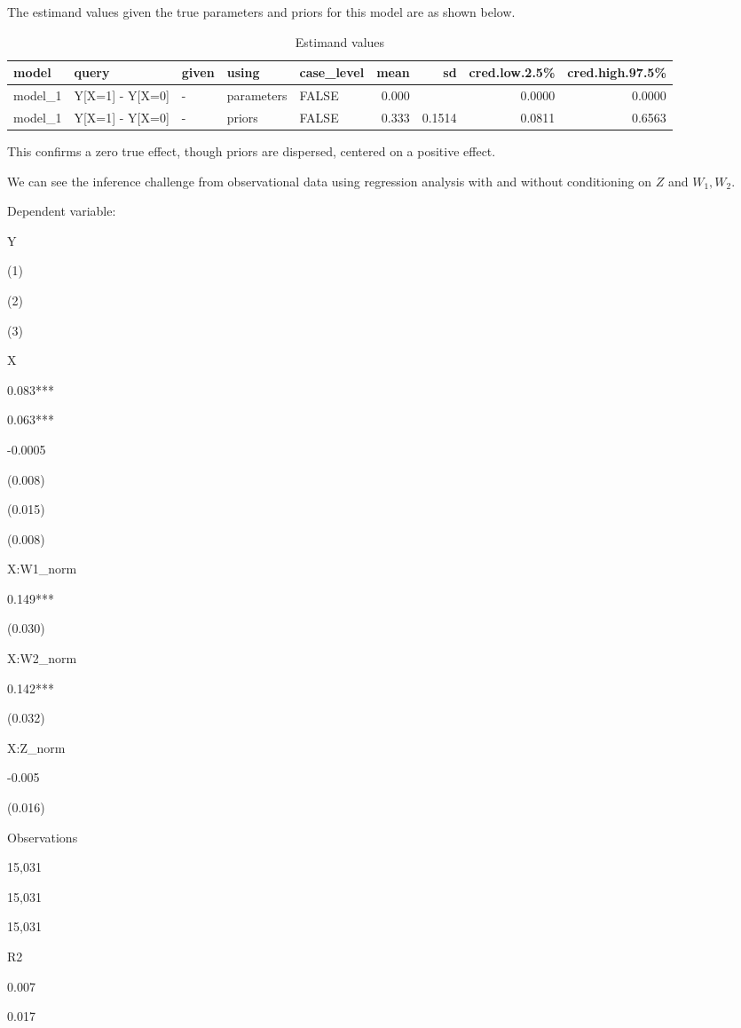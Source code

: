 \documentclass[
  12pt,
]{book}
\begin{document}
The estimand values given the true parameters and priors for this model are as shown below.

\begin{table}

\caption{\label{tab:appsimpleselcconf5}Estimand values}
\centering
\begin{tabular}[t]{l|l|l|l|l|r|r|r|r}
\hline
model & query & given & using & case\_level & mean & sd & cred.low.2.5\% & cred.high.97.5\%\\
\hline
model\_1 & Y[X=1] - Y[X=0] & - & parameters & FALSE & 0.000 &  & 0.0000 & 0.0000\\
\hline
model\_1 & Y[X=1] - Y[X=0] & - & priors & FALSE & 0.333 & 0.1514 & 0.0811 & 0.6563\\
\hline
\end{tabular}
\end{table}

This confirms a zero true effect, though priors are dispersed, centered on a positive effect.

We can see the inference challenge from observational data using regression analysis with and without conditioning on \(Z\) and \(W_1, W_2\).

Dependent variable:

Y

(1)

(2)

(3)

X

0.083***

0.063***

-0.0005

(0.008)

(0.015)

(0.008)

X:W1\_norm

0.149***

(0.030)

X:W2\_norm

0.142***

(0.032)

X:Z\_norm

-0.005

(0.016)

Observations

15,031

15,031

15,031

R2

0.007

0.017
\end{document}

